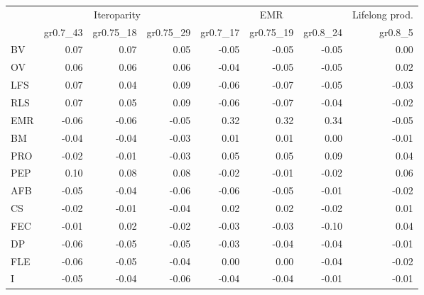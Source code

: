 \begin{landscape}
\begin{table}
\begin{footnotesize}
\begin{tabular}{@{}l|rrr|rrr|r@{}}
\toprule
 & \multicolumn{3}{c|}{Iteroparity} & \multicolumn{3}{c|}{EMR} & \multicolumn{1}{c}{Lifelong prod.}\\
 & gr0.7\_43 & gr0.75\_18 & gr0.75\_29 & gr0.7\_17 & gr0.75\_19 & gr0.8\_24 & gr0.8\_5\\
\midrule
BV & 0.07 & 0.07 & 0.05 & -0.05 & -0.05 & -0.05 & 0.00\\
OV & 0.06 & 0.06 & 0.06 & -0.04 & -0.05 & -0.05 & 0.02\\
LFS & 0.07 & 0.04 & 0.09 & -0.06 & -0.07 & -0.05 & -0.03\\
RLS & 0.07 & 0.05 & 0.09 & -0.06 & -0.07 & -0.04 & -0.02\\
EMR & -0.06 & -0.06 & -0.05 & 0.32 & 0.32 & 0.34 & -0.05\\
BM & -0.04 & -0.04 & -0.03 & 0.01 & 0.01 & 0.00 & -0.01\\
PRO & -0.02 & -0.01 & -0.03 & 0.05 & 0.05 & 0.09 & 0.04\\
PEP & 0.10 & 0.08 & 0.08 & -0.02 & -0.01 & -0.02 & 0.06\\
AFB & -0.05 & -0.04 & -0.06 & -0.06 & -0.05 & -0.01 & -0.02\\
CS & -0.02 & -0.01 & -0.04 & 0.02 & 0.02 & -0.02 & 0.01\\
FEC & -0.01 & 0.02 & -0.02 & -0.03 & -0.03 & -0.10 & 0.04\\
DP & -0.06 & -0.05 & -0.05 & -0.03 & -0.04 & -0.04 & -0.01\\
FLE & -0.06 & -0.05 & -0.04 & 0.00 & 0.00 & -0.04 & -0.02\\
I & -0.05 & -0.04 & -0.06 & -0.04 & -0.04 & -0.01 & -0.01\\
\bottomrule
\end{tabular}
\end{footnotesize}
\end{table}

\end{landscape}%


